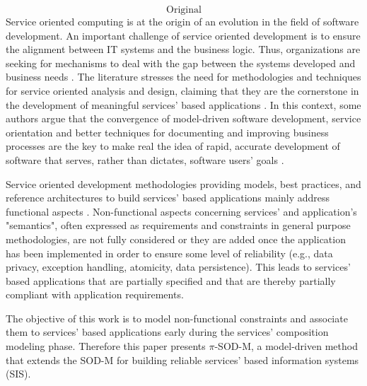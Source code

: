 {\[ \mathrm{Original} \]
Service oriented computing is at the origin of an evolution in the field of software development. 
An important challenge of service oriented development is  to ensure the alignment between IT systems and the business logic.
Thus, organizations are  seeking for mechanisms to deal with the gap between the systems developed and business needs \cite{bell}. The literature stresses the need for methodologies and techniques for service oriented analysis and design, claiming that they are the cornerstone  in the development of meaningful services' based applications \cite{5}.  In this context, some authors argue that the convergence of model-driven software development, service orientation and better techniques for documenting and improving business processes are the key to make real the idea of rapid, accurate development of software that serves, rather than dictates, software users' goals \cite{watson}. 

Service oriented development methodologies providing models, best practices, and reference architectures to build services' based applications mainly address  functional aspects \cite{1,2,decastro1,PapazoglouH06}.  Non-functional aspects concerning services' and application's "semantics", often expressed as requirements and constraints in general purpose methodologies, are not fully considered or they are added once the application has been implemented in order to ensure some level of reliability (e.g., data privacy, exception handling, atomicity, data persistence). This leads to services' based applications that are partially specified and that are thereby partially compliant with application requirements.

The objective of this work   is to model non-functional constraints and associate them to  services' based applications  early during the services' composition modeling phase. Therefore this paper presents $\pi$-SOD-M, a model-driven method  that extends the SOD-M  \cite{decastro1} for building reliable  services' based information systems (SIS). 

}
